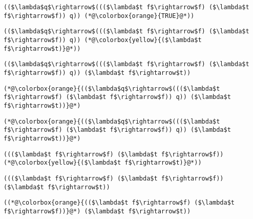 \documentclass{beamer}
\begin{document}
\begin{frame}[fragile]{\CurrentSection}
\lstset{basicstyle=\ttfamily\small}\lstset{numbers=none}\lstset{language=ML}\begin{lstlisting}
(($\lambda$q$\rightarrow$((($\lambda$t f$\rightarrow$f) ($\lambda$t f$\rightarrow$f)) q)) (*@\colorbox{orange}{TRUE}@*))
\end{lstlisting}
\pause\lstset{language=ML}\begin{lstlisting}
(($\lambda$q$\rightarrow$((($\lambda$t f$\rightarrow$f) ($\lambda$t f$\rightarrow$f)) q)) (*@\colorbox{yellow}{($\lambda$t f$\rightarrow$t)}@*))
\end{lstlisting}

\end{frame}

\begin{frame}[fragile]{\CurrentSection}
\lstset{basicstyle=\ttfamily\small}\lstset{numbers=none}\lstset{language=ML}\begin{lstlisting}
(($\lambda$q$\rightarrow$((($\lambda$t f$\rightarrow$f) ($\lambda$t f$\rightarrow$f)) q)) ($\lambda$t f$\rightarrow$t))
\end{lstlisting}
\pause\lstset{language=ML}\begin{lstlisting}
(*@\colorbox{orange}{(($\lambda$q$\rightarrow$((($\lambda$t f$\rightarrow$f) ($\lambda$t f$\rightarrow$f)) q)) ($\lambda$t f$\rightarrow$t))}@*)
\end{lstlisting}

\end{frame}

\begin{frame}[fragile]{\CurrentSection}
\lstset{basicstyle=\ttfamily\small}\lstset{numbers=none}\lstset{language=ML}\begin{lstlisting}
(*@\colorbox{orange}{(($\lambda$q$\rightarrow$((($\lambda$t f$\rightarrow$f) ($\lambda$t f$\rightarrow$f)) q)) ($\lambda$t f$\rightarrow$t))}@*)
\end{lstlisting}
\pause\lstset{language=ML}\begin{lstlisting}
((($\lambda$t f$\rightarrow$f) ($\lambda$t f$\rightarrow$f)) (*@\colorbox{yellow}{($\lambda$t f$\rightarrow$t)}@*))
\end{lstlisting}

\end{frame}

\begin{frame}[fragile]{\CurrentSection}
\lstset{basicstyle=\ttfamily\small}\lstset{numbers=none}\lstset{language=ML}\begin{lstlisting}
((($\lambda$t f$\rightarrow$f) ($\lambda$t f$\rightarrow$f)) ($\lambda$t f$\rightarrow$t))
\end{lstlisting}
\pause\lstset{language=ML}\begin{lstlisting}
((*@\colorbox{orange}{(($\lambda$t f$\rightarrow$f) ($\lambda$t f$\rightarrow$f))}@*) ($\lambda$t f$\rightarrow$t))
\end{lstlisting}

\end{frame}
\end{document}
